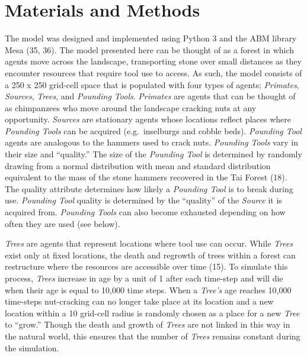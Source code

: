 \documentclass[9pt,twocolumn,twoside,]{pnas-new}
\begin{document}
\hypertarget{materials-and-methods}{%
\section{Materials and Methods}\label{materials-and-methods}}

The model was designed and implemented using Python 3 and the ABM
library Mesa (35, 36). The model presented here can be thought of as a
forest in which agents move across the landscape, transporting stone
over small distances as they encounter resources that require tool use
to access. As such, the model consists of a 250 x 250 grid-cell space
that is populated with four types of agents; \emph{Primates},
\emph{Sources}, \emph{Trees}, and \emph{Pounding Tools}. \emph{Primates}
are agents that can be thought of as chimpanzees who move around the
landscape cracking nuts at any opportunity. \emph{Sources} are
stationary agents whose locations reflect places where \emph{Pounding
Tools} can be acquired (e.g.~inselburgs and cobble beds). \emph{Pounding
Tool} agents are analogous to the hammers used to crack nuts.
\emph{Pounding Tools} vary in their size and ``quality.'' The size of
the \emph{Pounding Tool} is determined by randomly drawing from a normal
distribution with mean and standard distribution equivalent to the mass
of the stone hammers recovered in the Tai Forest (18). The quality
attribute determines how likely a \emph{Pounding Tool} is to break
during use. \emph{Pounding Tool} quality is determined by the
``quality'' of the \emph{Source} it is acquired from. \emph{Pounding
Tools} can also become exhausted depending on how often they are used
(see below).

\emph{Trees} are agents that represent locations where tool use can
occur. While \emph{Trees} exist only at fixed locations, the death and
regrowth of trees within a forest can restructure where the resources
are accessible over time (15). To simulate this process, \emph{Trees}
increase in age by a unit of 1 after each time-step and will die when
their age is equal to 10,000 time steps. When a \emph{Tree's} age
reaches 10,000 time-steps nut-cracking can no longer take place at its
location and a new location within a 10 grid-cell radius is randomly
chosen as a place for a new \emph{Tree} to ``grow.'' Though the death
and growth of \emph{Trees} are not linked in this way in the natural
world, this ensures that the number of \emph{Trees} remains constant
during the simulation.
\end{document}
